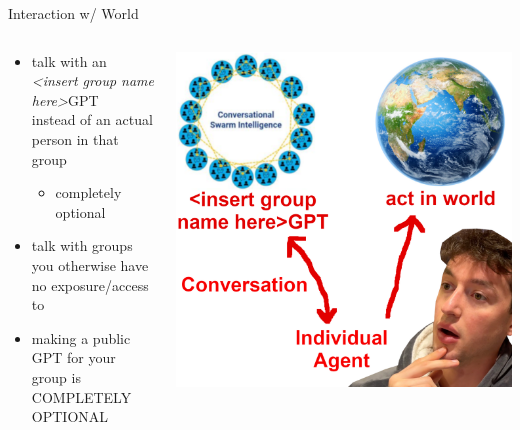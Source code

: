 \documentclass[aspectratio=169]{beamer}
\begin{document}
\begin{frame}{Interaction w/ World}
\begin{columns}[T]
    \begin{column}[T]{0.5\textwidth}
        \begin{itemize}
            \item talk with an\\ \textit{<insert group name here>}GPT\\ instead of an actual person in that group
            \begin{itemize}
                \item completely optional
            \end{itemize}
            \item talk with groups you otherwise have no exposure/access to
            \item making a public GPT for your group is COMPLETELY OPTIONAL
        \end{itemize}
    \end{column}
    \begin{column}{0.5\textwidth}
        \includegraphics[height=0.8\textheight]{imgs/CSI_section/agency.png}
    \end{column}
\end{columns}
\end{frame}
\end{document}
